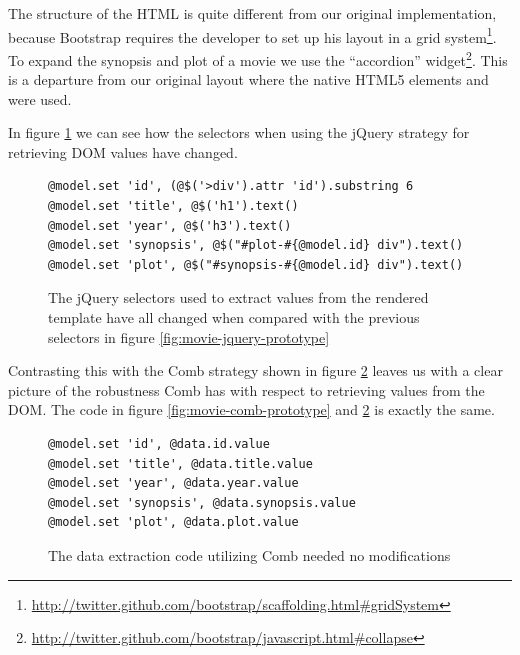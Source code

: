 \documentclass[thesis.tex]{subfiles}
\begin{document}
The structure of the HTML is quite different from our original implementation,
because Bootstrap requires the developer to set up his layout in a grid
system\footnote{\url{http://twitter.github.com/bootstrap/scaffolding.html\#gridSystem}}.
To expand the synopsis and plot of a movie we use the ``accordion''
widget\footnote{\url{http://twitter.github.com/bootstrap/javascript.html\#collapse}}.
This is a departure from our original layout where the native HTML5 elements
 and  were used.

In figure \ref{fig:movie-jquery-bootstrap} we can see how the selectors when
using the jQuery strategy for retrieving DOM values have changed.
\begin{figure}
	\centering
	\begin{lstlisting}
@model.set 'id', (@$('>div').attr 'id').substring 6
@model.set 'title', @$('h1').text()
@model.set 'year', @$('h3').text()
@model.set 'synopsis', @$("#plot-#{@model.id} div").text()
@model.set 'plot', @$("#synopsis-#{@model.id} div").text()
	\end{lstlisting}
	\caption{The jQuery selectors used to extract values from the rendered
	template have all changed when compared with the previous selectors in
	figure \ref{fig:movie-jquery-prototype}}
	\label{fig:movie-jquery-bootstrap}
\end{figure}
Contrasting this with the Comb strategy shown in figure \ref{fig:movie-comb-bootstrap}
leaves us with a clear picture of the robustness Comb has with respect to
retrieving values from the DOM.
The code in figure \ref{fig:movie-comb-prototype} and
\ref{fig:movie-comb-bootstrap} is exactly the same.
\begin{figure}
	\centering
	\begin{lstlisting}
@model.set 'id', @data.id.value
@model.set 'title', @data.title.value
@model.set 'year', @data.year.value
@model.set 'synopsis', @data.synopsis.value
@model.set 'plot', @data.plot.value
	\end{lstlisting}
	\caption{The data extraction code utilizing Comb needed no modifications}
	\label{fig:movie-comb-bootstrap}
\end{figure}
\end{document}
